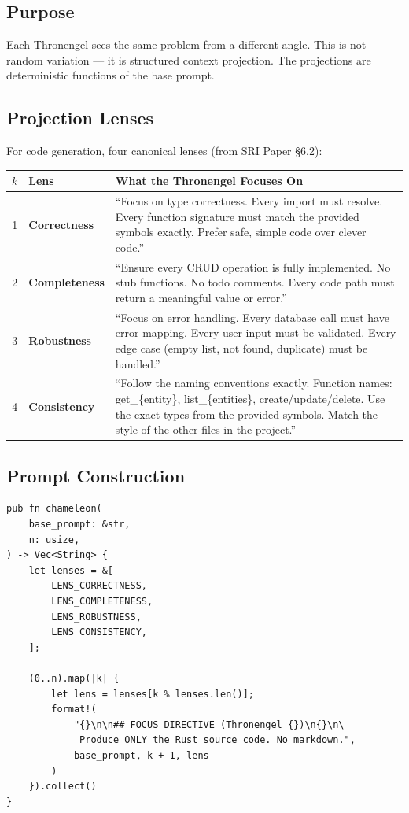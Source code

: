 \documentclass[11pt,a4paper]{article}
\begin{document}
\subsection{Purpose}

Each Thronengel sees the same problem from a different angle. This 
is not random variation --- it is structured context projection. 
The projections are deterministic functions of the base prompt.

\subsection{Projection Lenses}

For code generation, four canonical lenses (from SRI Paper \S6.2):

\begin{longtable}{clp{7cm}}
\toprule
\textbf{$k$} & \textbf{Lens} & \textbf{What the Thronengel Focuses On} \\
\midrule
1 & \textbf{Correctness}
  & ``Focus on type correctness. Every import must resolve. 
    Every function signature must match the provided symbols 
    exactly. Prefer safe, simple code over clever code.'' \\
2 & \textbf{Completeness}
  & ``Ensure every CRUD operation is fully implemented. No 
    stub functions. No todo comments. Every code path must 
    return a meaningful value or error.'' \\
3 & \textbf{Robustness}
  & ``Focus on error handling. Every database call must have 
    error mapping. Every user input must be validated. Every 
    edge case (empty list, not found, duplicate) must be 
    handled.'' \\
4 & \textbf{Consistency}
  & ``Follow the naming conventions exactly. Function names: 
    get\_\{entity\}, list\_\{entities\}, create/update/delete. 
    Use the exact types from the provided symbols. Match the 
    style of the other files in the project.'' \\
\bottomrule
\end{longtable}

\subsection{Prompt Construction}

\begin{lstlisting}[style=rust]
pub fn chameleon(
    base_prompt: &str,
    n: usize,
) -> Vec<String> {
    let lenses = &[
        LENS_CORRECTNESS,
        LENS_COMPLETENESS,
        LENS_ROBUSTNESS,
        LENS_CONSISTENCY,
    ];
    
    (0..n).map(|k| {
        let lens = lenses[k % lenses.len()];
        format!(
            "{}\n\n## FOCUS DIRECTIVE (Thronengel {})\n{}\n\
             Produce ONLY the Rust source code. No markdown.",
            base_prompt, k + 1, lens
        )
    }).collect()
}
\end{lstlisting}
\end{document}
